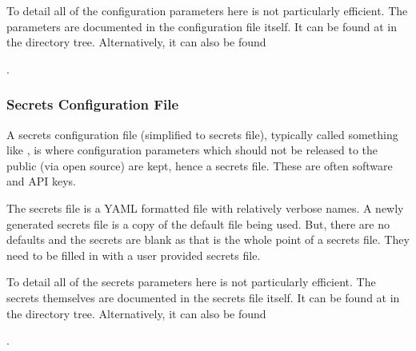 \documentclass[letterpaper,11pt,english]{sphinxmanual}
\begin{document}
\sphinxAtStartPar
To detail all of the configuration parameters here is not particularly
efficient. The parameters are documented in the configuration file itself.
It can be found at  in
the directory tree. Alternatively, it can also be found
%
\begin{footnote}[9]\sphinxAtStartFootnote
{}
%
\end{footnote}.


\subsubsection{Secrets Configuration File}
\label{\detokenize{user/configuration:secrets-configuration-file}}\label{\detokenize{user/configuration:user-configuration-secrets-configuration-file}}
\sphinxAtStartPar
A secrets configuration file (simplified to secrets file), typically
called something like , is where configuration parameters
which should not be released to the public (via open source) are kept, hence a
secrets file. These are often software and API keys.

\sphinxAtStartPar
The secrets file is a YAML formatted file with relatively verbose names.
A newly generated secrets file is a copy of the default file being used. But,
there are no defaults and the secrets are blank as that is the whole point of
a secrets file. They need to be filled in with a user provided secrets file.

\sphinxAtStartPar
To detail all of the secrets parameters here is not particularly efficient.
The secrets themselves are documented in the secrets file itself. It can be
found at  in the directory tree.
Alternatively, it can also be found %
\begin{footnote}[10]\sphinxAtStartFootnote
{}
%
\end{footnote}.
\end{document}
